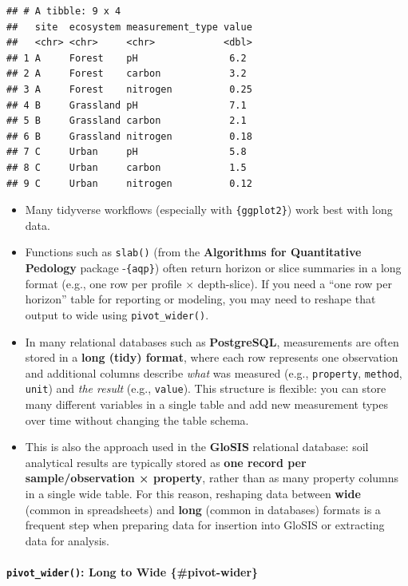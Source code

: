 \documentclass[
  10pt,
  b5paper,
  oneside]{book}
\begin{document}
\begin{verbatim}
## # A tibble: 9 x 4
##   site  ecosystem measurement_type value
##   <chr> <chr>     <chr>            <dbl>
## 1 A     Forest    pH                6.2 
## 2 A     Forest    carbon            3.2 
## 3 A     Forest    nitrogen          0.25
## 4 B     Grassland pH                7.1 
## 5 B     Grassland carbon            2.1 
## 6 B     Grassland nitrogen          0.18
## 7 C     Urban     pH                5.8 
## 8 C     Urban     carbon            1.5 
## 9 C     Urban     nitrogen          0.12
\end{verbatim}

\begin{itemize}
\item
  Many tidyverse workflows (especially with \texttt{\{ggplot2\}}) work best with long data.
\item
  Functions such as \texttt{slab()} (from the \textbf{Algorithms for Quantitative Pedology} package -\texttt{\{aqp\}}) often return horizon or slice summaries in a long format (e.g., one row per profile × depth-slice). If you need a ``one row per horizon'' table for reporting or modeling, you may need to reshape that output to wide using \texttt{pivot\_wider()}.
\item
  In many relational databases such as \textbf{PostgreSQL}, measurements are often stored in a \textbf{long (tidy) format}, where each row represents one observation and additional columns describe \emph{what} was measured (e.g., \texttt{property}, \texttt{method}, \texttt{unit}) and \emph{the result} (e.g., \texttt{value}). This structure is flexible: you can store many different variables in a single table and add new measurement types over time without changing the table schema.
\item
  This is also the approach used in the \textbf{GloSIS} relational database: soil analytical results are typically stored as \textbf{one record per sample/observation × property}, rather than as many property columns in a single wide table. For this reason, reshaping data between \textbf{wide} (common in spreadsheets) and \textbf{long} (common in databases) formats is a frequent step when preparing data for insertion into GloSIS or extracting data for analysis.
\end{itemize}

\paragraph*{\texorpdfstring{\texttt{pivot\_wider()}: Long to Wide \{\#pivot-wider\}}{pivot\_wider(): Long to Wide \{\#pivot-wider\}}}\label{pivot_wider-long-to-wide-pivot-wider}
\end{document}
